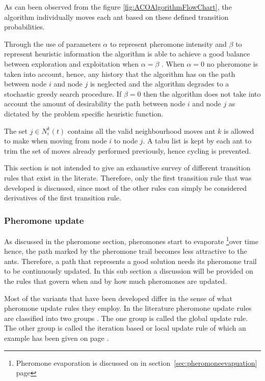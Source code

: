 As can been observed from the figure \ref{fig:ACOAlgorithmFlowChart}, the algorithm individually moves each ant based on these defined transition probabilities.

Through the use of parameters $\alpha$ to represent pheromone intensity and $\beta$ to represent heuristic information the algorithm is able to achieve a good balance between exploration and exploitation when $\alpha=\beta$ \cite{CompuIntelligenceIntro,ACOLargeProblem,AntQAP,FundamentalSwarm}. When $\alpha = 0$ no pheromone is taken into account, hence, any history that the algorithm has on the path between node $i$ and node $j$ is neglected and the algorithm degrades to a stochastic greedy search procedure. If $\beta = 0$ then the algorithm does not take into account the amount of desirability the path between node $i$ and node $j$ as dictated by the problem specific heuristic function.

The set $j \in N^k_i(t)$ contains all the valid neighbourhood moves ant $k$ is allowed to make when moving from node $i$ to node $j$. A tabu list is kept by each ant to trim the set of moves already performed previously, hence cycling is prevented.

This section is not intended to give an exhaustive survey of different transition rules that exist in the literate. Therefore, only the first transition rule that was developed is discussed, since most of the other rules can simply be considered derivatives of the first transition rule.
\subsubsection{Pheromone update}
As discussed in the pheromone section, pheromones start to evaporate \footnote{Pheromone evaporation is discussed on in section~\ref{sec:pheromoneevapuation} page \pageref{sec:pheromoneevapuation}}over time hence, the path marked by the pheromone trail becomes less attractive to the ants. Therefore, a path that represents a good solution needs its pheromone trail to be continuously updated. In this sub section a discussion will be provided on the rules that govern when and by how much pheromones are updated.

 Most of the variants that have been developed differ in the sense of what pheromone update rules they employ. In the literature pheromone update rules are classified into two groups \cite{CompuIntelligenceIntro}. The one group is called the global update rule. The other group is called the iteration based or local update rule of which an example has been given on page \pageref{def:localpheromoneupdate} \cite{CompuIntelligenceIntro}. 

